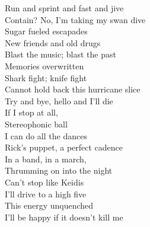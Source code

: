 Run and sprint and fast and jive \\

Contain? No, I'm taking my swan dive \\

Sugar fueled escapades \\

New friends and old drugs \\

Blast the music; blast the past \\

Memories overwritten \\

Shark fight; knife fight \\

Cannot hold back this hurricane slice \\

Try and bye, hello and I'll die \\

If I stop at all, \\

Stereophonic ball \\

I can do all the dances \\

Rick's puppet, a perfect cadence \\

In a band, in a march, \\

Thrumming on into the night \\

Can't stop like Keidis \\

I'll drive to a high five \\

This energy unquenched \\

I'll be happy if it doesn't kill me \\




